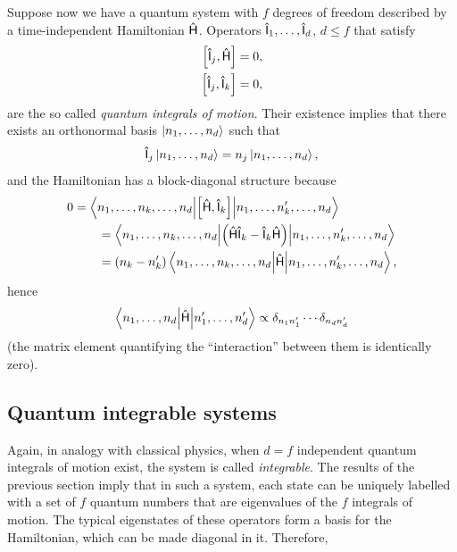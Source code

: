\documentclass[a4paper,11pt,twoside]{article}
\begin{document}
        Suppose now we have a quantum system with $f$ degrees of freedom described by a time-independent Hamiltonian $\mathsf{\hat{H}}$.
        Operators $\mathsf{\hat{I}}_{1},\dotsc,\mathsf{\hat{I}}_{d}$, $d\leq f$ that satisfy
        \begin{align}
            \left[{\mathsf{\hat{I}}_{j}},{\mathsf{\hat{H}}}\right]&=0,\nonumber\\
            \left[{\mathsf{\hat{I}}_{j}},{\mathsf{\hat{I}}_{k}}\right]&=0,
        \end{align}
        are the so called \emph{quantum integrals of motion}.
        Their existence implies that there exists an orthonormal basis $\left|{n_{1},\dotsc,n_{d}}\right\rangle$ such that 
        \begin{equation}
            \mathsf{\hat{I}}_{j}\left|{n_{1},\dotsc,n_{d}}\right\rangle=n_{j}\left|{n_{1},\dotsc,n_{d}}\right\rangle,
        \end{equation}
        and the Hamiltonian has a block-diagonal structure because
        \begin{align}
            0&=\left\langle{n_{1},\dotsc,n_{k},\dotsc,n_{d}}\middle|{\left[{\mathsf{\hat{H}}},{\mathsf{\hat{I}}_{k}}\right]}\middle|{n_{1},\dotsc,n'_{k},\dotsc,n_{d}}\right\rangle\nonumber\\
            &\qquad=\left\langle{n_{1},\dotsc,n_{k},\dotsc,n_{d}}\middle|{\left(\mathsf{\hat{H}}\mathsf{\hat{I}}_{k}-\mathsf{\hat{I}}_{k}\mathsf{\hat{H}}\right)}\middle|{n_{1},\dotsc,n'_{k},\dotsc,n_{d}}\right\rangle\\
            &\qquad=\left(n_{k}-n'_{k}\right)\left\langle{n_{1},\dotsc,n_{k},\dotsc,n_{d}}\middle|{\mathsf{\hat{H}}}\middle|{n_{1},\dotsc,n'_{k},\dotsc,n_{d}}\right\rangle,\nonumber
        \end{align}
        hence
        \begin{equation}
            \left\langle{n_{1},\dotsc,n_{d}}\middle|{\mathsf{\hat{H}}}\middle|{n'_{1},\dotsc,n'_{d}}\right\rangle\propto\delta_{n_{1}n'_{1}}\dotsb\delta_{n_{d}n'_{d}}
        \end{equation}
         (the matrix element quantifying the ``interaction'' between them is identically zero).

    \subsection{Quantum integrable systems}
        Again, in analogy with classical physics, when $d=f$ independent quantum integrals of motion exist, the system is called \emph{integrable}.
        The results of the previous section imply that in such a system, each state can be uniquely labelled with a set of $f$ quantum numbers that are eigenvalues of the $f$ integrals of motion.
        The typical eigenstates of these operators form a basis for the Hamiltonian, which can be made diagonal in it.
        Therefore, 
\end{document}
